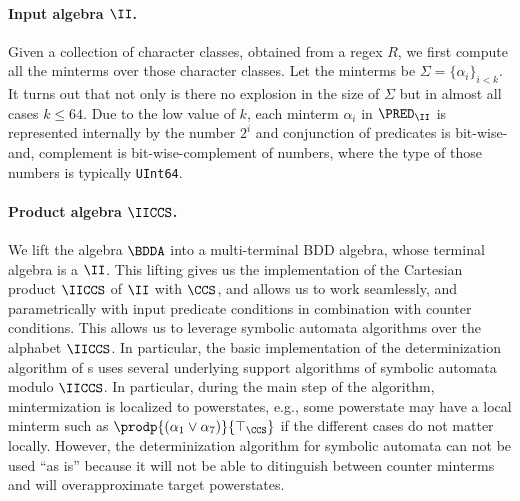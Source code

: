 \paragraph{Input algebra $\II$.}

Given a collection of character classes, obtained from a regex $R$, we
first compute all the minterms over those character classes. Let the
minterms be $\Sigma = \{\alpha_i\}_{i<k}$. It turns out that not only is there
no explosion in the size of $\Sigma$ but in almost all
cases $k\leq 64$.  Due to the low value of $k$, each
minterm $\alpha_i$ in $\PRED_{\II}$ is represented internally by the
number $2^i$ and conjunction of predicates is bit-wise-and, complement
is bit-wise-complement of numbers, where the type of those numbers
is typically \texttt{UInt64}.


\paragraph{Product algebra $\IICCS$.}
We lift the algebra $\BDDA$ into a multi-terminal BDD algebra, whose
terminal algebra is a $\II$.  This lifting gives us the implementation
of the Cartesian product $\IICCS$ of $\II$ with $\CCS$, and allows us
to work seamlessly, and parametrically with input predicate conditions
in combination with counter conditions. This allows us to leverage
symbolic automata algorithms over the alphabet $\IICCS$. In
particular, the basic implementation of the determinization algorithm
of {\CA}s uses several underlying support algorithms of symbolic
automata modulo $\IICCS$.  In particular, during the main step of the
algorithm, mintermization is localized to powerstates, e.g., some
powerstate may have a local minterm such as
$\prodp{(\alpha_1\vee\alpha_7)}{\top_{\CCS}}$ if the different cases
do not matter locally. However, the
determinization algorithm for symbolic automata can not be used
``as is'' because it will not be able to ditinguish between
counter minterms and will overapproximate target powerstates.

